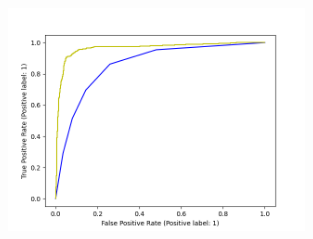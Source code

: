 \documentclass[a4paper]{article}
\theoremstyle{definition}
\newenvironment{soln}{
    \leavevmode\color{blue}\ignorespaces
}{}
\begin{document}
\begin{enumerate}
	      \begin{soln}
		      \begin{figure}[h!]
						\centering
			      \includegraphics[width=0.7\textwidth]{../img/q2-5.png}
		      \end{figure}
	      \end{soln}
			
\end{enumerate}

\end{document}
